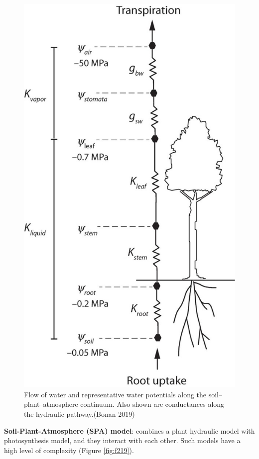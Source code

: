 \documentclass[12pt,oneside]{book}
\begin{document}
\begin{figure}

{\centering \includegraphics[width=0.8\linewidth]{figures/chap2/hydraulics} 

}

\caption{Flow of water and representative water potentials along the soil–plant–atmosphere continuum. Also shown are conductances along the hydraulic pathway.(Bonan 2019)}\label{fig:f218}
\end{figure}

\textbf{Soil-Plant-Atmosphere (SPA) model}: combines a plant hydraulic
model with photosynthesis model, and they interact with each other. Such
models have a high level of complexity (Figure \ref{fig:f219}).
\end{document}
